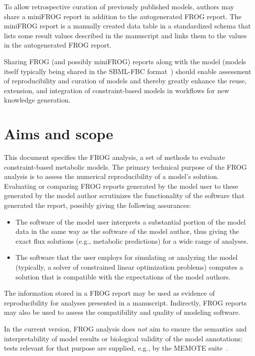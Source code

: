 To allow retrospective curation of previously published models, authors may share a miniFROG report in addition to the autogenerated FROG report.
The miniFROG report is a manually created data table in a standardized schema that lists some result values described in the manuscript and links them to the values in the autogenerated FROG report.

Sharing FROG (and possibly miniFROG) reports along with the model (models itself typically being shared in the SBML-FBC format~\cite{olivier2018sbmlfbc}) should enable assessment of reproducibility and curation of models and thereby greatly enhance the reuse, extension, and integration of constraint-based models in workflows for new knowledge generation.

\section{Aims and scope}
\label{sec:aims}

This document specifies the FROG analysis, a set of methods to evaluate constraint-based metabolic models.
The primary technical purpose of the FROG analysis is to assess the numerical reproducibility of a model's solution.
Evaluating or comparing FROG reports generated by the model user to these generated by the model author scrutinizes the functionality of the software that generated the report, possibly giving the following assurances:
\begin{itemize}
\item The software of the model user interprets a substantial portion of the model data in the same way as the software of the model author, thus giving the exact flux solutions (e.g., metabolic predictions) for a wide range of analyses.
\item The software that the user employs for simulating or analyzing the model (typically, a solver of constrained linear optimization problems) computes a solution that is compatible with the expectations of the model authors.
\end{itemize}

The information stored in a FROG report may be used as evidence of reproducibility for analyses presented in a manuscript.
Indirectly, FROG reports may also be used to assess the compatibility and quality of modeling software.

In the current version, FROG analysis does \emph{not} aim to ensure the semantics and interpretability of model results or biological validity of the model annotations; tests relevant for that purpose are supplied, e.g., by the MEMOTE suite~\cite{lieven2020memote}.


